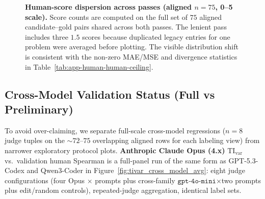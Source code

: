 \documentclass{article}
\begin{document}
\begin{figure}[t]
  \centering
  \caption{\textbf{Human-score dispersion across passes (aligned \(n=75\), 0--5 scale).}
    Score counts are computed on the full set of \(75\) aligned candidate--gold pairs shared across both passes. The lenient pass includes three \(1.5\) scores because duplicated legacy entries for one problem were averaged before plotting. The visible distribution shift is consistent with the non-zero MAE/MSE and divergence statistics in Table~\ref{tab:app-human-human-ceiling}.}
  \label{fig:app-human-pass-hist}
\end{figure}

\subsection{Cross-Model Validation Status (Full vs Preliminary)}
To avoid over-claiming, we separate full-scale cross-model regressions (\(n{=}8\) judge tuples on the \(\sim\!\!72\)–\(75\) overlapping aligned rows for each labeling view) from narrower exploratory protocol plots.
\textbf{Anthropic Claude Opus (4.x)} \(\mathrm{TI}_{\mathrm{var}}\) vs.\ validation human Spearman is a full-panel run of the same form as GPT-5.3-Codex and Qwen3-Coder in Figure~\ref{fig:tivar_cross_model_avg}: eight judge configurations (four Opus \(\times\) prompts plus cross-family \(\texttt{gpt-4o-mini}\)\(\times\)two prompts plus edit/random controls), repeated-judge aggregation, identical label sets.
\end{document}
